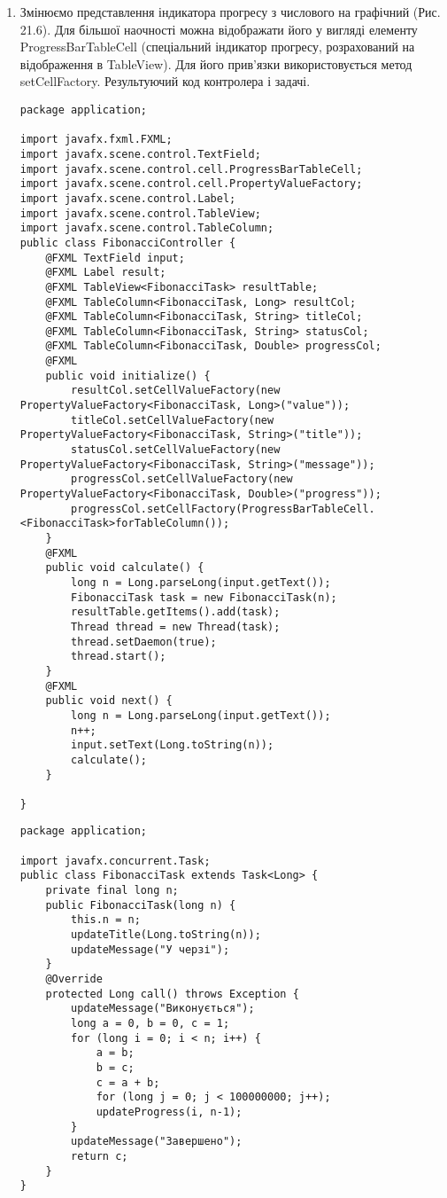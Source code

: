 \begin{enumerate}
	\item Змінюємо представлення індикатора прогресу з числового на графічний (Рис. 21.6).
Для більшої наочності можна відображати його у вигляді елементу ProgressBarTableCell (спеціальний індикатор прогресу, розрахований на відображення в TableView). Для його прив'язки використовується метод setCellFactory. Результуючий код контролера і задачі.

\begin{verbatim}
package application;

import javafx.fxml.FXML;
import javafx.scene.control.TextField;
import javafx.scene.control.cell.ProgressBarTableCell;
import javafx.scene.control.cell.PropertyValueFactory;
import javafx.scene.control.Label;
import javafx.scene.control.TableView;
import javafx.scene.control.TableColumn;
public class FibonacciController {
	@FXML TextField input;
	@FXML Label result;
	@FXML TableView<FibonacciTask> resultTable;
	@FXML TableColumn<FibonacciTask, Long> resultCol;
	@FXML TableColumn<FibonacciTask, String> titleCol;
	@FXML TableColumn<FibonacciTask, String> statusCol;
	@FXML TableColumn<FibonacciTask, Double> progressCol;
	@FXML
	public void initialize() {
		resultCol.setCellValueFactory(new PropertyValueFactory<FibonacciTask, Long>("value"));
		titleCol.setCellValueFactory(new PropertyValueFactory<FibonacciTask, String>("title"));
		statusCol.setCellValueFactory(new PropertyValueFactory<FibonacciTask, String>("message"));
		progressCol.setCellValueFactory(new PropertyValueFactory<FibonacciTask, Double>("progress"));
		progressCol.setCellFactory(ProgressBarTableCell.<FibonacciTask>forTableColumn());
	}
	@FXML
	public void calculate() {
		long n = Long.parseLong(input.getText());
		FibonacciTask task = new FibonacciTask(n);
		resultTable.getItems().add(task);
		Thread thread = new Thread(task);
		thread.setDaemon(true);
		thread.start();
	}
	@FXML
	public void next() {
		long n = Long.parseLong(input.getText());
		n++;
		input.setText(Long.toString(n));
		calculate();
	}

}
\end{verbatim}

\begin{verbatim}
package application;

import javafx.concurrent.Task;
public class FibonacciTask extends Task<Long> {
	private final long n;
	public FibonacciTask(long n) {
		this.n = n;
		updateTitle(Long.toString(n));
		updateMessage("У черзі");
	}
	@Override
	protected Long call() throws Exception {
		updateMessage("Виконується");
		long a = 0, b = 0, c = 1;
		for (long i = 0; i < n; i++) {
			a = b;
			b = c;
			c = a + b;
			for (long j = 0; j < 100000000; j++);
			updateProgress(i, n-1);
		}
		updateMessage("Завершено");
		return c;
	}
}
\end{verbatim}


\end{enumerate}
